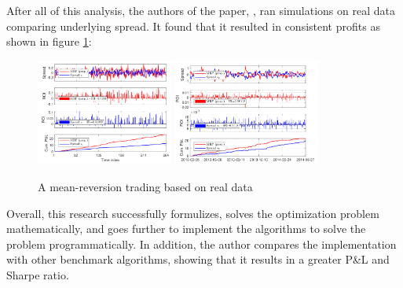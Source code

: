 \noindent After all of this analysis, the authors of the paper, \cite{8450775, ZipingZhao2019OMPW}, ran simulations on real data comparing underlying spread. It found that it resulted in consistent profits as shown in figure \ref{fig:ROIsMRP}:

\begin{figure}[htb!]
    \centering
    \includegraphics[width=0.4\textwidth]{background/Images/rois1.png}
    \includegraphics[width=0.43\textwidth]{background/Images/rois2.png}
    \caption{A mean-reversion trading based on real data~\cite{ZipingZhao2019OMPW}}
    \label{fig:ROIsMRP}
\end{figure}

\noindent Overall, this research successfully formulizes, solves the optimization problem mathematically, and goes further to implement the algorithms to solve the problem programmatically. In addition, the author compares the implementation with other benchmark algorithms, showing that it results in a greater P\&L and Sharpe ratio.

